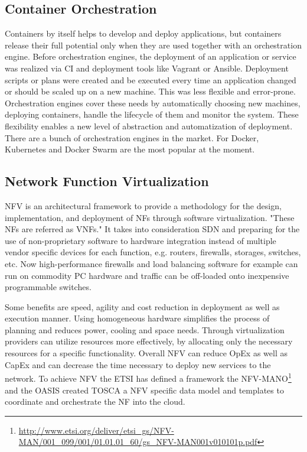\subsection{Container Orchestration}
Containers by itself helps to develop and deploy applications, but containers release their full potential only when they are used together with an orchestration engine.
Before orchestration engines, the deployment of an application or service was realized via \ac{CI} and deployment tools like Vagrant or Ansible.
Deployment scripts or plans were created and be executed every time an application changed or should be scaled up on a new machine.
This was less flexible and error-prone.
Orchestration engines cover these needs by automatically choosing new machines, deploying containers, handle the lifecycle of them and monitor the system.
These flexibility enables a new level of abstraction and automatization of deployment.
There are a bunch of orchestration engines in the market.
For Docker, Kubernetes and Docker Swarm are the most popular at the moment.


\subsection{Network Function Virtualization}
\ac{NFV} is an architectural framework to provide a methodology for the design, implementation, and deployment of \acp{NF} through software virtualization.\autocite[cf.][p. 8]{ETSI:NFV:2013}\autocite[cf.]{Rivenes:2014}
"These \acp{NF} are referred as \acp{VNF}."\autocite[p. 8]{ETSI:NFV:2013}
It takes into consideration \ac{SDN} and preparing for the use of non-proprietary software to hardware integration instead of multiple vendor specific devices for each function, e.g. routers, firewalls, storages, switches, etc.\autocite[cf.]{Rivenes:2014}
Now high-performance firewalls and load balancing software for example can run on commodity PC hardware and traffic can be off-loaded onto inexpensive programmable switches.\autocite[cf.]{Noble:2015}

Some benefits are speed, agility and cost reduction in deployment as well as execution manner.\autocite[cf.]{Noble:2015}
Using homogeneous hardware simplifies the process of planning and reduces power, cooling and space needs.\autocite[cf.]{Noble:2015}
Through virtualization providers can utilize resources more effectively, by allocating only the necessary resources for a specific functionality.\autocite[cf.]{Noble:2015}
Overall \ac{NFV} can reduce \ac{OpEx} as well as \ac{CapEx} and can decrease the time necessary to deploy new services to the network.\autocite[cf.]{Noble:2015}
To achieve \ac{NFV} the \ac{ETSI} has defined a framework the \ac{NFV-MANO}\footnote{\url{http://www.etsi.org/deliver/etsi_gs/NFV-MAN/001_099/001/01.01.01_60/gs_NFV-MAN001v010101p.pdf}} and the \ac{OASIS} created \ac{TOSCA} a \ac{NFV} specific data model and templates to coordinate and orchestrate the \ac{NF} into the cloud.

